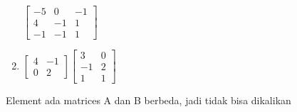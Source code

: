 \documentclass[12pt, a4paper, onecolumn, oneside, final, bahasa]{report}
\begin{document}
\begin{enumerate}
  \(\begin{bmatrix} -5 & 0 & -1 \\ 4 & -1 & 1 \\ -1 & -1 & 1 \end{bmatrix}\)
\item
  \(\begin{bmatrix} 4 & -1 \\ 0 & 2 \end{bmatrix} \begin{bmatrix} 3 & 0 \\ -1 & 2 \\ 1 & 1 \end{bmatrix}\)
\end{enumerate}

Element ada matrices A dan B berbeda, jadi tidak bisa dikalikan
\end{document}
